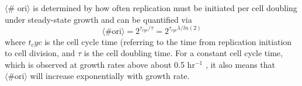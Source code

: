 $\langle$\# ori$\rangle$ is determined by how often
replication must be initiated per cell doubling under steady-state growth
and can be quantified via
\begin{equation}
    \langle \text{\# ori} \rangle = 2^{\tau_{cyc} / \tau} = 2^{\tau_{cyc} \lambda / ln(2)}
    \label{eq:Nori}
\end{equation}
where $t_cyc$ is the cell cycle time (referring to the time from replication
initiation to cell division, and $\tau$ is the cell doubling time. For a
constant cell cycle time, which is observed at growth rates above about 0.5 hr$^{-1}$
\cite{helmstetter1968}, it also means that $\langle \text{\# ori} \rangle$ will increase
exponentially with growth rate.










